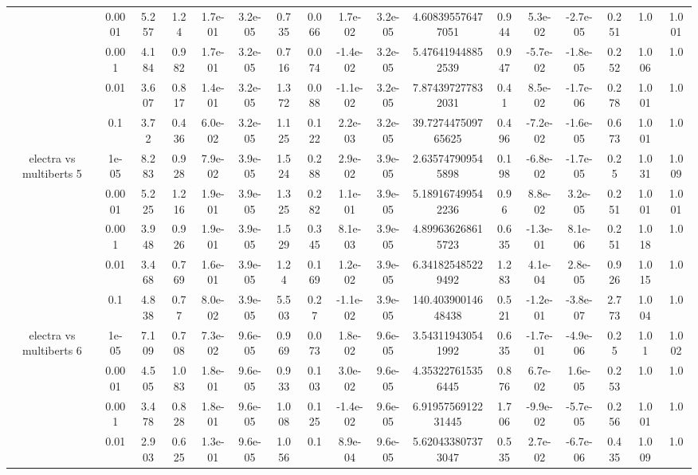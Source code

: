 \begin{tabular}{|c|c|c|c|c|c|c|c|c|c|c|c|c|c|c|c|c|}
 & 0.0001 & 5.257 & 1.24 & 1.7e-01 & 3.2e-05 & 0.735 & 0.066 & 1.7e-02 & 3.2e-05 & 4.608395576477051 & 0.944 & 5.3e-02 & -2.7e-05 & 0.251 & 1.0 & 1.001 \\
 & 0.001 & 4.184 & 0.982 & 1.7e-01 & 3.2e-05 & 0.716 & 0.074 & -1.4e-02 & 3.2e-05 & 5.476419448852539 & 0.947 & -5.7e-02 & -1.8e-05 & 0.252 & 1.006 & 1.0 \\
 & 0.01 & 3.607 & 0.817 & 1.4e-01 & 3.2e-05 & 1.372 & 0.088 & -1.1e-02 & 3.2e-05 & 7.874397277832031 & 0.41 & 8.5e-02 & -1.7e-06 & 0.278 & 1.001 & 1.0 \\
 & 0.1 & 3.72 & 0.436 & 6.0e-02 & 3.2e-05 & 1.125 & 0.122 & 2.2e-03 & 3.2e-05 & 39.727447509765625 & 0.496 & -7.2e-02 & -1.6e-05 & 0.673 & 1.001 & 1.0 \\
\hline
\multirow{5}{*}{electra  vs multiberts 5} & 1e-05 & 8.283 & 0.928 & 7.9e-02 & 3.9e-05 & 1.524 & 0.288 & 2.9e-02 & 3.9e-05 & 2.635747909545898 & 0.198 & -6.8e-02 & -1.7e-05 & 0.25 & 1.031 & 1.009 \\
 & 0.0001 & 5.225 & 1.216 & 1.9e-01 & 3.9e-05 & 1.325 & 0.282 & 1.1e-01 & 3.9e-05 & 5.189167499542236 & 0.96 & 8.8e-02 & 3.2e-05 & 0.251 & 1.001 & 1.001 \\
 & 0.001 & 3.948 & 0.926 & 1.9e-01 & 3.9e-05 & 1.529 & 0.345 & 8.1e-03 & 3.9e-05 & 4.899636268615723 & 0.635 & -1.3e-01 & 8.1e-06 & 0.251 & 1.018 & 1.0 \\
 & 0.01 & 3.468 & 0.769 & 1.6e-01 & 3.9e-05 & 1.24 & 0.169 & 1.2e-02 & 3.9e-05 & 6.341825485229492 & 1.283 & 4.1e-04 & 2.8e-05 & 0.926 & 1.015 & 1.0 \\
 & 0.1 & 4.838 & 0.77 & 8.0e-02 & 3.9e-05 & 5.503 & 0.27 & -1.1e-02 & 3.9e-05 & 140.40390014648438 & 0.521 & -1.2e-01 & -3.8e-07 & 2.773 & 1.004 & 1.0 \\
\hline
\multirow{5}{*}{electra  vs multiberts 6} & 1e-05 & 7.109 & 0.708 & 7.3e-02 & 9.6e-05 & 0.969 & 0.073 & 1.8e-02 & 9.6e-05 & 3.543119430541992 & 0.635 & -1.7e-01 & -4.9e-06 & 0.25 & 1.01 & 1.002 \\
 & 0.0001 & 4.505 & 1.083 & 1.8e-01 & 9.6e-05 & 0.933 & 0.103 & 3.0e-02 & 9.6e-05 & 4.353227615356445 & 0.876 & 6.7e-02 & 1.6e-05 & 0.253 & 1.0 & 1.0 \\
 & 0.001 & 3.478 & 0.828 & 1.8e-01 & 9.6e-05 & 1.008 & 0.125 & -1.4e-02 & 9.6e-05 & 6.9195756912231445 & 1.706 & -9.9e-02 & -5.7e-05 & 0.256 & 1.001 & 1.0 \\
 & 0.01 & 2.903 & 0.625 & 1.3e-01 & 9.6e-05 & 1.056 & 0.1 & 8.9e-04 & 9.6e-05 & 5.620433807373047 & 0.535 & 2.7e-02 & -6.7e-06 & 0.435 & 1.009 & 1.0 \\

\end{tabular}
